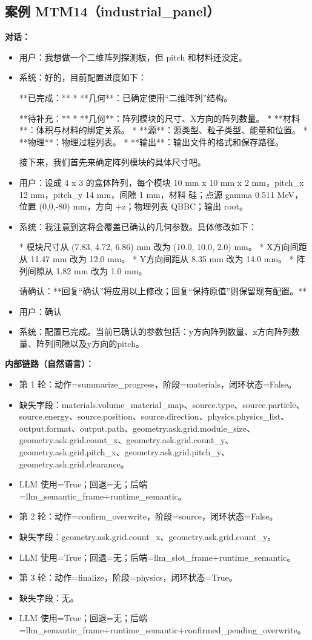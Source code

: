 \documentclass[11pt]{ctexart}
\begin{document}
\subsection{案例 MTM14（industrial\_panel）}
\textbf{对话：}
\begin{itemize}
\item 用户：我想做一个二维阵列探测板，但 pitch 和材料还没定。
\item 系统：好的，目前配置进度如下：

**已完成：**
*   **几何**：已确定使用“二维阵列”结构。

**待补充：**
*   **几何**：阵列模块的尺寸、X方向的阵列数量。
*   **材料**：体积与材料的绑定关系。
*   **源**：源类型、粒子类型、能量和位置。
*   **物理**：物理过程列表。
*   **输出**：输出文件的格式和保存路径。

接下来，我们首先来确定阵列模块的具体尺寸吧。
\item 用户：设成 4 x 3 的盒体阵列，每个模块 10 mm x 10 mm x 2 mm，pitch\_x 12 mm，pitch\_y 14 mm，间隙 1 mm，材料 硅；点源 gamma 0.511 MeV，位置 (0,0,-80) mm，方向 +z；物理列表 QBBC；输出 root。
\item 系统：我注意到这将会覆盖已确认的几何参数。具体修改如下：

*   模块尺寸从 (7.83, 4.72, 6.86) mm 改为 (10.0, 10.0, 2.0) mm。
*   X方向间距从 11.47 mm 改为 12.0 mm。
*   Y方向间距从 8.35 mm 改为 14.0 mm。
*   阵列间隙从 1.82 mm 改为 1.0 mm。

请确认：**回复“确认”将应用以上修改；回复“保持原值”则保留现有配置。**
\item 用户：确认
\item 系统：配置已完成。当前已确认的参数包括：y方向阵列数量、x方向阵列数量、阵列间隙以及y方向的pitch。
\end{itemize}
\textbf{内部链路（自然语言）：}
\begin{itemize}
\item 第 1 轮：动作=summarize\_progress，阶段=materials，闭环状态=False。
\item 缺失字段：materials.volume\_material\_map、source.type、source.particle、source.energy、source.position、source.direction、physics.physics\_list、output.format、output.path、geometry.ask.grid.module\_size、geometry.ask.grid.count\_x、geometry.ask.grid.count\_y、geometry.ask.grid.pitch\_x、geometry.ask.grid.pitch\_y、geometry.ask.grid.clearance。
\item LLM 使用=True；回退=无；后端=llm\_semantic\_frame+runtime\_semantic。
\item 第 2 轮：动作=confirm\_overwrite，阶段=source，闭环状态=False。
\item 缺失字段：geometry.ask.grid.count\_x、geometry.ask.grid.count\_y。
\item LLM 使用=True；回退=无；后端=llm\_slot\_frame+runtime\_semantic。
\item 第 3 轮：动作=finalize，阶段=physics，闭环状态=True。
\item 缺失字段：无。
\item LLM 使用=True；回退=无；后端=llm\_semantic\_frame+runtime\_semantic+confirmed\_pending\_overwrite。
\end{itemize}
\end{document}
